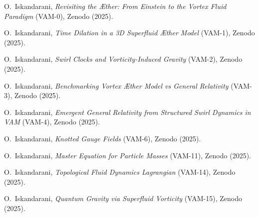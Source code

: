 \documentclass[11pt]{article}
\begin{document}
    \begin{thebibliography}{9}

        O.~Iskandarani,
        \emph{Revisiting the \AE ther: From Einstein to the Vortex Fluid Paradigm} (VAM-0), Zenodo (2025).

        O.~Iskandarani,
        \emph{Time Dilation in a 3D Superfluid \AE ther Model} (VAM-1), Zenodo (2025).

        O.~Iskandarani,
        \emph{Swirl Clocks and Vorticity-Induced Gravity} (VAM-2), Zenodo (2025).

        O.~Iskandarani,
        \emph{Benchmarking Vortex \AE ther Model vs General Relativity} (VAM-3), Zenodo (2025).

        O.~Iskandarani,
        \emph{Emergent General Relativity from Structured Swirl Dynamics in VAM} (VAM-4), Zenodo (2025).

        O.~Iskandarani,
        \emph{Knotted Gauge Fields} (VAM-6), Zenodo (2025).

        O.~Iskandarani,
        \emph{Master Equation for Particle Masses} (VAM-11), Zenodo (2025).

        O.~Iskandarani,
        \emph{Topological Fluid Dynamics Lagrangian} (VAM-14), Zenodo (2025).

        O.~Iskandarani,
        \emph{Quantum Gravity via Superfluid Vorticity} (VAM-15), Zenodo (2025).

    \end{thebibliography}
\end{document}
